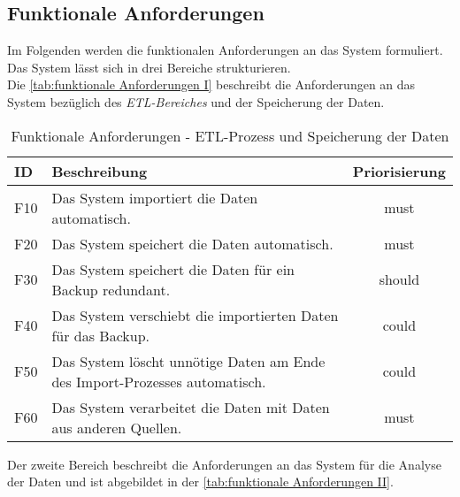 \subsection{Funktionale Anforderungen}
Im Folgenden werden die funktionalen Anforderungen an das System formuliert. Das System lässt sich in drei Bereiche strukturieren.\\
Die \autoref{tab:funktionale Anforderungen I} beschreibt die Anforderungen an das System bezüglich des \textit{ETL-Bereiches} und der Speicherung der Daten. 

\begingroup
\setlength{\tabcolsep}{10pt} %
\renewcommand{\arraystretch}{1.25}
\begin{table}[h]
    \centering
    \begin{adjustbox}{max width=\textwidth}
    \begin{tabular}{lp{13cm}c}
       \toprule
       \textbf{ID}          & \textbf{Beschreibung} &\textbf{Priorisierung}\\
       \midrule
        F10                               &Das System importiert die Daten automatisch. & must\\
        F20                               &Das System speichert die Daten automatisch.  & must\\
        F30                               &Das System speichert die Daten für ein Backup redundant.  & should\\
        F40                               &Das System verschiebt die importierten Daten für das Backup.  & could\\
        F50                               &Das System löscht unnötige Daten am Ende des Import-Prozesses automatisch.  & could\\
        F60                               &Das System verarbeitet die Daten mit Daten aus anderen Quellen.  & must\\
    \bottomrule
    \end{tabular}
    \end{adjustbox}
    \caption{%
        Funktionale Anforderungen - ETL-Prozess und Speicherung der Daten
    }
    \label{tab:funktionale Anforderungen I}
    \end{table}
\endgroup

Der zweite Bereich beschreibt die Anforderungen an das System für die Analyse der Daten und ist abgebildet in der \autoref{tab:funktionale Anforderungen II}.


